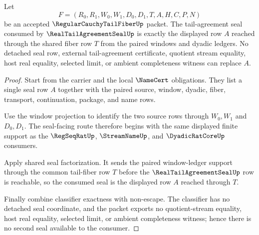 \begin{theorem}
\label{thm:regular-cauchy-tail-fiber-tail-agreement-seal-exactness}
Let
$$
F=(R_0,R_1,W_0,W_1,D_0,D_1,T,A,H,C,P,N)
$$
be an accepted $\RegularCauchyTailFiberUp$ packet. The tail-agreement seal consumed by $\RealTailAgreementSealUp$ is exactly the displayed row $A$ reached through the shared fiber row $T$ from the paired windows and dyadic ledgers. No detached seal row, external tail-agreement certificate, quotient stream equality, host real equality, selected limit, or ambient completeness witness can replace $A$.
\end{theorem}
\begin{proof}
Start from the carrier and the local $\NameCert$ obligations. They list a single seal row $A$ together with the paired source, window, dyadic, fiber, transport, continuation, package, and name rows.

Use the window projection to identify the two source rows through $W_0,W_1$ and $D_0,D_1$. The seal-facing route therefore begins with the same displayed finite support as the $\RegSeqRatUp$, $\StreamNameUp$, and $\DyadicRatCoreUp$ consumers.

Apply shared seal factorization. It sends the paired window-ledger support through the common tail-fiber row $T$ before the $\RealTailAgreementSealUp$ row is reachable, so the consumed seal is the displayed row $A$ reached through $T$.

Finally combine classifier exactness with non-escape. The classifier has no detached seal coordinate, and the packet exports no quotient-stream equality, host real equality, selected limit, or ambient completeness witness; hence there is no second seal available to the consumer.
\end{proof}

